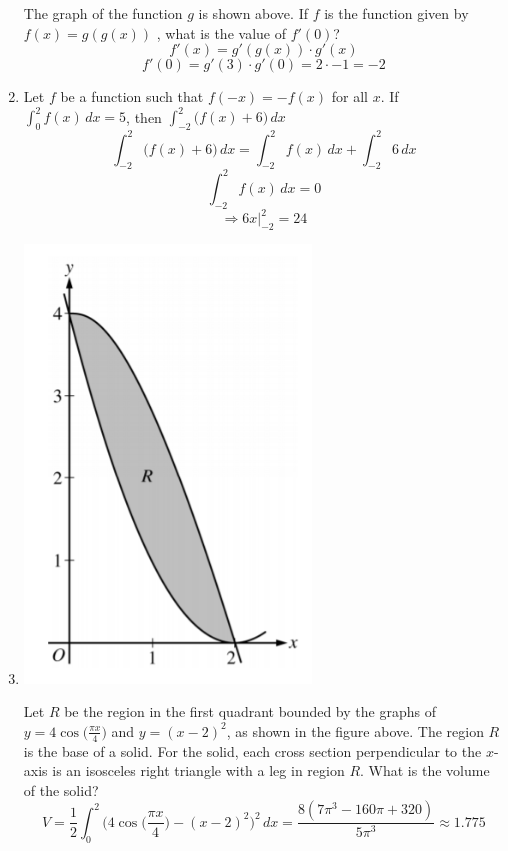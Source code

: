 \documentclass[12pt]{article}
\begin{document}
\begin{enumerate}
\begin{center}
        \end{center}
    The graph of the function $g$ is shown above. If $f$ is the function given by $f(x) =g(g(x))$ , what is the value of  $f'(0)$?
    $$f'(x)=g'(g(x))\cdot g'(x)$$  
    $$f'(0)= g'(3)\cdot g'(0) = 2 \cdot -1 = \boxed{-2}$$
    \item Let $f$ be a function such that $f(-x) = -f(x)$  for all $x$. If $\int_{0}^{2} f(x) \, dx = 5$, then $\int_{-2}^{2}\big(f(x)+6\big) \, dx$
    $$\int_{-2}^{2}\big(f(x)+6\big) \, dx =\int_{-2}^{2} f(x)\, dx + \int_{-2}^{2} 6 \, dx $$
    $$\int_{-2}^{2} f(x)\, dx = 0$$
    $$\Longrightarrow 6x \biggr\rvert_{-2}^{2} =\boxed{24}$$
    \item 
        \begin{center}
            \includegraphics[width=3in]{FEP 11.png}
        \end{center}
     Let $R$ be the region in the first quadrant bounded by the graphs of $y = 4 \cos \bigg(\frac{\pi x}{4}\bigg)$ and $y = (x-2)^2$, as shown in the figure above. The region $R$ is the base of a solid. For the solid, each cross section perpendicular to the $x$-axis is an isosceles right triangle with a leg in region $R$. What is the volume of the solid?
     $$\boxed{V=\frac{1}{2}\int_{0}^{2} \biggr(4 \cos \bigg(\frac{\pi x}{4}\bigg) - (x-2)^2\bigg)^2\, dx = \frac{8(7\pi^3 -160\pi+320)}{5\pi^3}\approx 1.775}$$
\end{enumerate}
\end{document}
